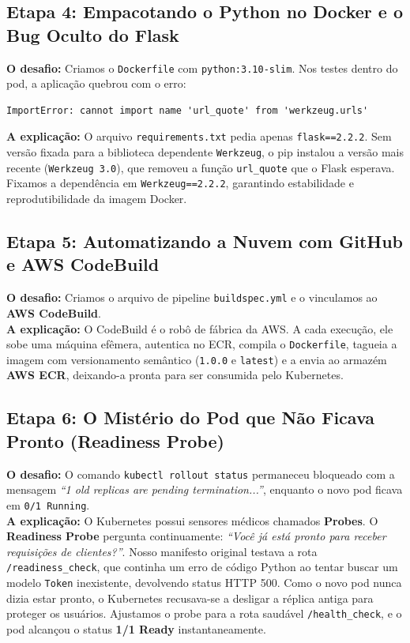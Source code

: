 \documentclass[11pt,a4paper]{article}
\begin{document}
\subsection{Etapa 4: Empacotando o Python no Docker e o Bug Oculto do Flask}
\textbf{O desafio:} Criamos o \texttt{Dockerfile} com \texttt{python:3.10-slim}. Nos testes dentro do pod, a aplicação quebrou com o erro:
\begin{lstlisting}
ImportError: cannot import name 'url_quote' from 'werkzeug.urls'
\end{lstlisting}
\textbf{A explicação:} O arquivo \texttt{requirements.txt} pedia apenas \texttt{flask==2.2.2}. Sem versão fixada para a biblioteca dependente \texttt{Werkzeug}, o pip instalou a versão mais recente (\texttt{Werkzeug 3.0}), que removeu a função \texttt{url\_quote} que o Flask esperava. Fixamos a dependência em \texttt{Werkzeug==2.2.2}, garantindo estabilidade e reprodutibilidade da imagem Docker.

\subsection{Etapa 5: Automatizando a Nuvem com GitHub e AWS CodeBuild}
\textbf{O desafio:} Criamos o arquivo de pipeline \texttt{buildspec.yml} e o vinculamos ao \textbf{AWS CodeBuild}.\\
\textbf{A explicação:} O CodeBuild é o robô de fábrica da AWS. A cada execução, ele sobe uma máquina efêmera, autentica no ECR, compila o \texttt{Dockerfile}, tagueia a imagem com versionamento semântico (\texttt{1.0.0} e \texttt{latest}) e a envia ao armazém \textbf{AWS ECR}, deixando-a pronta para ser consumida pelo Kubernetes.

\subsection{Etapa 6: O Mistério do Pod que Não Ficava Pronto (Readiness Probe)}
\textbf{O desafio:} O comando \texttt{kubectl rollout status} permaneceu bloqueado com a mensagem \textit{``1 old replicas are pending termination...''}, enquanto o novo pod ficava em \texttt{0/1 Running}.\\
\textbf{A explicação:} O Kubernetes possui sensores médicos chamados \textbf{Probes}. O \textbf{Readiness Probe} pergunta continuamente: \textit{``Você já está pronto para receber requisições de clientes?''}. Nosso manifesto original testava a rota \texttt{/readiness\_check}, que continha um erro de código Python ao tentar buscar um modelo \texttt{Token} inexistente, devolvendo status HTTP 500. Como o novo pod nunca dizia estar pronto, o Kubernetes recusava-se a desligar a réplica antiga para proteger os usuários. Ajustamos o probe para a rota saudável \texttt{/health\_check}, e o pod alcançou o status \textbf{1/1 Ready} instantaneamente.
\end{document}
